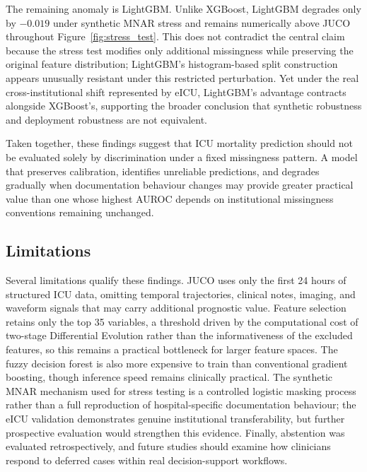\documentclass[journal]{IEEEtran}
\begin{document}
	\label{sec:lightgbm_anomaly}
	The remaining anomaly is LightGBM. Unlike XGBoost, LightGBM degrades only by $-0.019$ under synthetic MNAR stress and remains numerically above JUCO throughout Figure~\ref{fig:stress_test}. This does not contradict the central claim because the stress test modifies only additional missingness while preserving the original feature distribution; LightGBM's histogram-based split construction appears unusually resistant under this restricted perturbation. Yet under the real cross-institutional shift represented by eICU, LightGBM's advantage contracts alongside XGBoost's, supporting the broader conclusion that synthetic robustness and deployment robustness are not equivalent.
	
	Taken together, these findings suggest that ICU mortality prediction should not be evaluated solely by discrimination under a fixed missingness pattern. A model that preserves calibration, identifies unreliable predictions, and degrades gradually when documentation behaviour changes may provide greater practical value than one whose highest AUROC depends on institutional missingness conventions remaining unchanged.
	
	\subsection{Limitations}
	\label{sec:limitations}
	
	Several limitations qualify these findings. JUCO uses only the first 24 hours of structured ICU data, omitting temporal trajectories, clinical notes, imaging, and waveform signals that may carry additional prognostic value. Feature selection retains only the top 35 variables, a threshold driven by the computational cost of two-stage Differential Evolution rather than the informativeness of the excluded features, so this remains a practical bottleneck for larger feature spaces. The fuzzy decision forest is also more expensive to train than conventional gradient boosting, though inference speed remains clinically practical. The synthetic MNAR mechanism used for stress testing is a controlled logistic masking process rather than a full reproduction of hospital-specific documentation behaviour; the eICU validation demonstrates genuine institutional transferability, but further prospective evaluation would strengthen this evidence. Finally, abstention was evaluated retrospectively, and future studies should examine how clinicians respond to deferred cases within real decision-support workflows.
	
\end{document}
